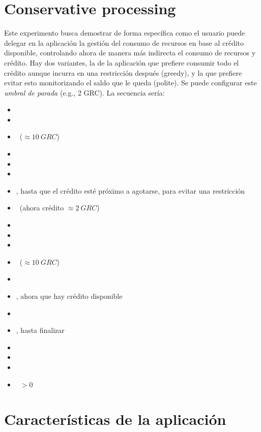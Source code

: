 \documentclass[preprint,3p]{elsarticle}
\begin{document}
\newpage
\section{Conservative processing}

\noindent 
Este experimento busca demostrar de forma específica como el usuario puede delegar en la aplicación la gestión del consumo de recursos en base al crédito disponible, controlando ahora de manera más indirecta el consumo de recursos y crédito. Hay dos variantes, la de la aplicación que prefiere consumir todo el crédito aunque incurra en una restricción después (greedy), y la que prefiere evitar esto monitorizando el saldo que le queda (polite). Se puede configurar este \textit{umbral de parada} (e.g., 2 GRC). La secuencia sería:

\begin{itemize}
	\setlength\itemsep{0em}
	\item \UserNoCredit
	\item \UserSendsSomeTasks
	\item \UserSendsCredit~($\approx 10~GRC$)
	\item \ContainerUp
	\item \AppStart
	\item \ServerlessAdapts
	\item \AppRuns, hasta que el crédito esté próximo a agotarse, para evitar una restricción
	\item \AppWaits~(ahora crédito $\approx 2~GRC$)
	\item \ServerlessDown
	\item \AccountingIdle
	\item \Wait
	\item \UserSendsCredit~($\approx 10~GRC$)
	\item \UserSendsSomeTasks
	\item \AppRuns, ahora que hay crédito disponible
	\item \ServerlessAdapts
	\item \AppRuns, hasta finalizar
	\item \ServerlessDown
	\item \AccountingIdle
	\item \ContainerTimeout
	\item \AccountingCredit~$> 0$
\end{itemize}


\newpage

\section{Características de la aplicación}
\end{document}
